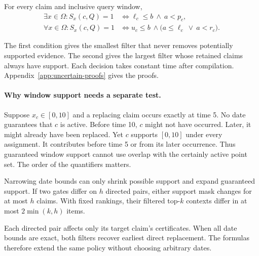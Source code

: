 \begin{theorem}
\label{thm:window-support}
For every claim and inclusive query window,
\begin{align}
 \exists x\in\Omega:S_x(c,Q)=1
 &\iff \ell_c\leq b\ \land\ a<p_c,
 \label{eq:possible-window}\\
 \forall x\in\Omega:S_x(c,Q)=1
 &\iff u_c\leq b\ \land\bigl(a\leq\ell_c\ \lor\ a<r_c\bigr).
 \label{eq:guaranteed-window}
\end{align}
\end{theorem}
The first condition gives the smallest filter that never removes potentially supported evidence.
The second gives the largest filter whose retained claims always have support.
Each decision takes constant time after compilation.
Appendix~\ref{app:uncertain-proofs} gives the proofs.

\paragraph{Why window support needs a separate test.}
Suppose $x_c\in[0,10]$ and a replacing claim occurs exactly at time 5.
No date guarantees that $c$ is active.
Before time 10, $c$ might not have occurred.
Later, it might already have been replaced.
Yet $c$ supports $[0,10]$ under every assignment.
It contributes before time 5 or from its later occurrence.
Thus guaranteed window support cannot use overlap with the certainly active point set.
The order of the quantifiers matters.

\begin{corollary}
\label{cor:uncertain-refinement}
Narrowing date bounds can only shrink possible support and expand guaranteed support.
If two gates differ on $h$ directed pairs, either support mask changes for at most $h$ claims.
With fixed rankings, their filtered top-$k$ contexts differ in at most $2\min(k,h)$ items.
\end{corollary}
Each directed pair affects only its target claim's certificates.
When all date bounds are exact, both filters recover earliest direct replacement.
The formulas therefore extend the same policy without choosing arbitrary dates.
